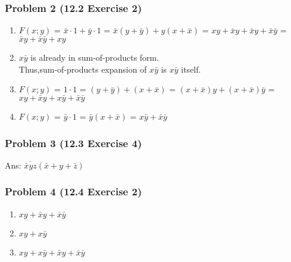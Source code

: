 \documentclass[12pt,hyperref={bookmarks=false}]{beamer}
\begin{document}
	\begin{frame}
	\frametitle{Problem 2 (12.2 Exercise 2)}
	\fontsize{10}{12pt}\selectfont
	\begin{enumerate}[label=(\alph*)]
	\setlength\itemsep{0em}
	\item $F(x; y) $ = $ \bar{x} \cdot 1 + \bar{y} \cdot 1 $ = $ \bar{x}(y + \bar{y}) + y(x+\bar{x})$ = $ xy + \bar{x}y + \bar{x}y + \bar{x}\bar{y}$ =  $\bar{x}y + \bar{x}\bar{y} + xy$
	\item $x\bar{y}$ is already in sum-of-products form.
	\\Thus,sum-of-products expansion of $x\bar{y}$ is    $x\bar{y}$ itself.
	\item $F(x; y) $ = $ 1 \cdot 1$ = $  (y + \bar{y}) + (x+\bar{x})$ = $ (x+\bar{x})y + (x+\bar{x})\bar{y} $	 =  $ xy + \bar{x}y + x\bar{y} +  \bar{x}\bar{y}$
	\item $F(x; y)$  =  $\bar{y} \cdot 1  $ = $ \bar{y} (x+\bar{x}) $ = $x\bar{y} + \bar{x}\bar{y} $
	\end{enumerate}
	\end{frame}
	

	\begin{frame}
	\frametitle{Problem 3 (12.3 Exercise 4)}
	\fontsize{12}{16pt}\selectfont
	Ans: $ \overline{\bar{x}yz} (\bar{x}+y+\bar{z})$
	\end{frame}

	\begin{frame}
	\frametitle{Problem 4 (12.4 Exercise 2)}
	\fontsize{12}{16pt}\selectfont
	\begin{enumerate}[label=(\alph*)]
	\setlength\itemsep{0em}
	\item $ xy + \bar{x}y + \bar{x}\bar{y}$
	\item $ xy + x\bar{y}$
	\item $ xy + x\bar{y} + \bar{x}y + \bar{x}\bar{y}$
	\end{enumerate}
	\end{frame}
	
	


		
\end{document}
